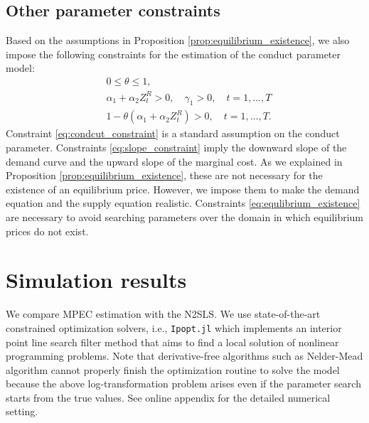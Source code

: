 \documentclass[11pt, a4paper]{article}
\begin{document}
\subsection{Other parameter constraints}
Based on the assumptions in Proposition \ref{prop:equilibrium_existence}, we also impose the following constraints for the estimation of the conduct parameter model:
\begin{align}
    &0\le\theta \le 1,\label{eq:condcut_constraint}\\
    &\alpha_1 + \alpha_2 Z_{t}^{R} >0, \quad \gamma_1>0 ,\quad t = 1,\ldots, T\label{eq:slope_constraint}\\
    &1- \theta(\alpha_1 + \alpha_2 Z_{t}^{R}) >0,\quad t = 1,\ldots, T.\label{eq:equlibrium_existence}
\end{align}
Constraint \eqref{eq:condcut_constraint} is a standard assumption on the conduct parameter.
Constraints \eqref{eq:slope_constraint} imply the downward slope of the demand curve and the upward slope of the marginal cost.
As we explained in Proposition \ref{prop:equilibrium_existence}, these are not necessary for the existence of an equilibrium price.
However, we impose them to make the demand equation and the supply equation realistic.
Constraints \eqref{eq:equlibrium_existence} are necessary to avoid searching parameters over the domain in which equilibrium prices do not exist. 

\section{Simulation results}\label{sec:results}

We compare MPEC estimation with the N2SLS.
We use state-of-the-art constrained optimization solvers, i.e., \texttt{Ipopt.jl} which implements an interior point line search filter method that aims to find a local solution of nonlinear programming problems.
Note that derivative-free algorithms such as Nelder-Mead algorithm cannot properly finish the optimization routine to solve the model because the above log-transformation problem arises even if the parameter search starts from the true values. See online appendix for the detailed numerical setting. 

\end{document}
